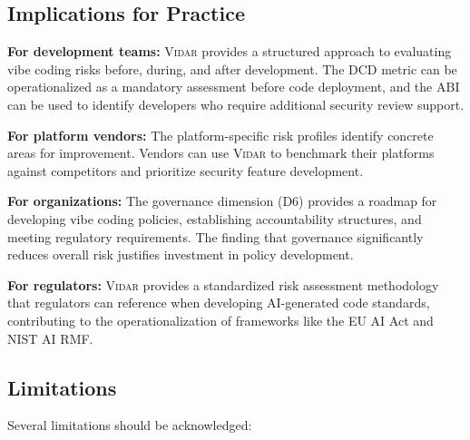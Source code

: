 \documentclass[preprint,review,12pt]{elsarticle}
\newcommand{\vidar}{\textsc{Vidar}}
\begin{document}
\subsection{Implications for Practice}
\label{subsec:implications}

\textbf{For development teams:} \vidar{} provides a structured approach to evaluating vibe coding risks before, during, and after development. The DCD metric can be operationalized as a mandatory assessment before code deployment, and the ABI can be used to identify developers who require additional security review support.

\textbf{For platform vendors:} The platform-specific risk profiles identify concrete areas for improvement. Vendors can use \vidar{} to benchmark their platforms against competitors and prioritize security feature development.

\textbf{For organizations:} The governance dimension (D6) provides a roadmap for developing vibe coding policies, establishing accountability structures, and meeting regulatory requirements. The finding that governance significantly reduces overall risk justifies investment in policy development.

\textbf{For regulators:} \vidar{} provides a standardized risk assessment methodology that regulators can reference when developing AI-generated code standards, contributing to the operationalization of frameworks like the EU AI Act and NIST AI RMF.


\subsection{Limitations}
\label{subsec:limitations}

Several limitations should be acknowledged:
\end{document}
